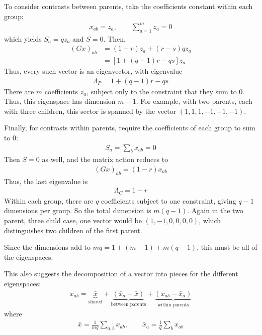 \documentclass[11pt, reqno]{amsart}
\theoremstyle{notestyle}
\theoremstyle{defstyle}
\begin{document}
To consider contrasts between parents, take the coefficients constant within each group:
\begin{align*}
    x_{ab} = z_a,
    \qquad \sum_{a=1}^m z_a = 0
\end{align*}
which yields $S_a = qz_a$ and $S = 0$.
Then,
\begin{align*}
    (Gx)_{ab}
    &= (1-r)z_a + (r-s)qz_a \\
    &= [1 + (q-1)r - qs]z_a
\end{align*}
Thus, every such vector is an eigenvector, with eigenvalue
\begin{align*}
    \boxed{\Lambda_P = 1 + (q-1)r -qs}
\end{align*}
There are $m$ coefficients $z_a$, subject only to the constraint that they sum to 0.
Thus, this eigenspace has dimension $m-1$.
For example, with two parents, each with three children, this sector is spanned by the vector $(1, 1, 1, -1, -1, -1)$.

Finally, for contrasts within parents, require the coefficients of each group to sum to 0:
\begin{align*}
    S_a = \sum_b x_{ab} = 0
\end{align*}
Then $S = 0$ as well, and the matrix action reduces to
\begin{align*}
    (Gx)_{ab} = (1-r)x_{ab}
\end{align*}
Thus, the last eigenvalue is
\begin{align*}
    \boxed{\Lambda_C = 1-r}
\end{align*}
Within each group, there are $q$ coefficients subject to one constraint, giving $q-1$ dimensions per group.
So the total dimension is $m(q-1)$.
Again in the two parent, three child case, one vector would be $(1, -1, 0, 0, 0, 0)$, which distinguishes two children of the first parent.

Since the dimensions add to $mq = 1 + (m-1) + m(q-1)$, this must be all of the eigenspaces.

This also suggests the decomposition of a vector into pieces for the different eigenspaces:
\begin{align*}
    x_{ab} = \underbrace{\bar{x}}_{\text{shared}} 
    + \underbrace{(\bar{x}_a - \bar{x})}_\text{between parents}
    + \underbrace{(x_{ab} - \bar{x}_a)}_\text{within parents}
\end{align*}
where
\begin{align*}
    \bar{x} = \frac{1}{mq} \sum_{a,b} x_{ab},
    \qquad
    \bar{x}_a = \frac{1}{q} \sum_b x_{ab}
\end{align*}
\end{document}
